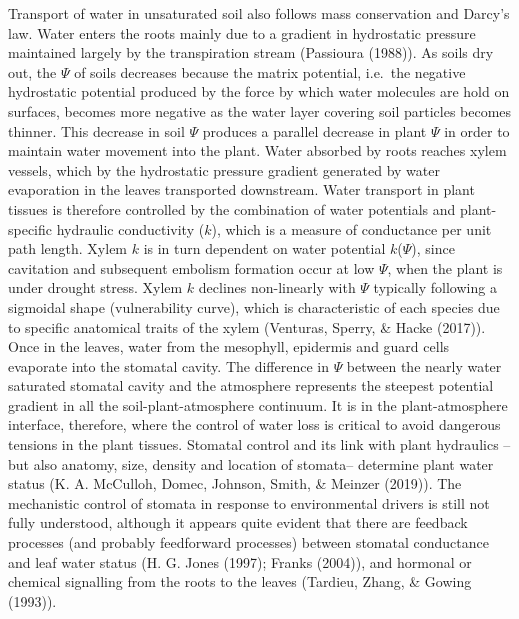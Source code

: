 \documentclass[11pt,twoside]{reedthesis}
\begin{document}
Transport of water in unsaturated soil also follows mass conservation
and Darcy's law. Water enters the roots mainly due to a gradient in
hydrostatic pressure maintained largely by the transpiration stream
(Passioura (1988)). As soils dry out, the \(\Psi\) of soils decreases
because the matrix potential, i.e.~the negative hydrostatic potential
produced by the force by which water molecules are hold on surfaces,
becomes more negative as the water layer covering soil particles becomes
thinner. This decrease in soil \(\Psi\) produces a parallel decrease in
plant \(\Psi\) in order to maintain water movement into the plant. Water
absorbed by roots reaches xylem vessels, which by the hydrostatic
pressure gradient generated by water evaporation in the leaves
transported downstream. Water transport in plant tissues is therefore
controlled by the combination of water potentials and plant-specific
hydraulic conductivity (\(k\)), which is a measure of conductance per
unit path length. Xylem \(k\) is in turn dependent on water potential
\(k\)(\(\Psi\)), since cavitation and subsequent embolism formation
occur at low \(\Psi\), when the plant is under drought stress. Xylem
\(k\) declines non-linearly with \(\Psi\) typically following a
sigmoidal shape (vulnerability curve), which is characteristic of each
species due to specific anatomical traits of the xylem (Venturas,
Sperry, \& Hacke (2017)). Once in the leaves, water from the mesophyll,
epidermis and guard cells evaporate into the stomatal cavity. The
difference in \(\Psi\) between the nearly water saturated stomatal
cavity and the atmosphere represents the steepest potential gradient in
all the soil-plant-atmosphere continuum. It is in the plant-atmosphere
interface, therefore, where the control of water loss is critical to
avoid dangerous tensions in the plant tissues. Stomatal control and its
link with plant hydraulics --but also anatomy, size, density and
location of stomata-- determine plant water status (K. A. McCulloh,
Domec, Johnson, Smith, \& Meinzer (2019)). The mechanistic control of
stomata in response to environmental drivers is still not fully
understood, although it appears quite evident that there are feedback
processes (and probably feedforward processes) between stomatal
conductance and leaf water status (H. G. Jones (1997); Franks (2004)),
and hormonal or chemical signalling from the roots to the leaves
(Tardieu, Zhang, \& Gowing (1993)).\par
\end{document}
